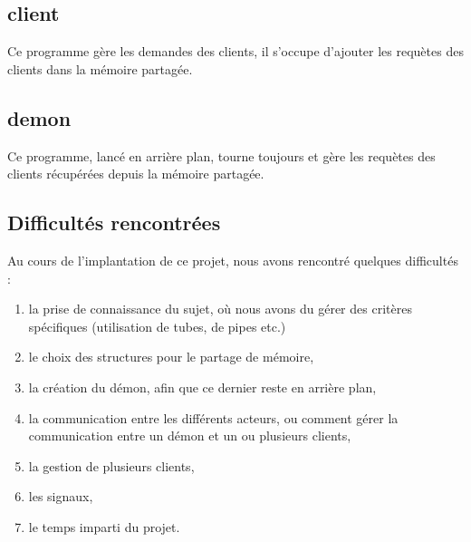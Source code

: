\subsection{client}
Ce programme gère les demandes des clients, 
il s'occupe d'ajouter les requètes des clients dans la mémoire partagée.

\subsection{demon}
Ce programme, lancé en arrière plan, tourne toujours 
et gère les requètes des clients récupérées depuis la mémoire partagée.  

\newpage

\subsection{Difficultés rencontrées}
Au cours de l'implantation de ce projet, 
nous avons rencontré quelques difficultés :

\begin{enumerate}
 \item la prise de connaissance du sujet, 
 où nous avons du gérer des critères spécifiques (utilisation de tubes, de pipes etc.)
 \item le choix des structures pour le partage de mémoire,
 \item la création du démon, afin que ce dernier reste en arrière plan,
 \item la communication entre les différents acteurs, ou comment gérer 
 la communication entre un démon et un ou plusieurs clients,
 \item la gestion de plusieurs clients,
 \item les signaux,
 \item le temps imparti du projet. 
\end{enumerate}
